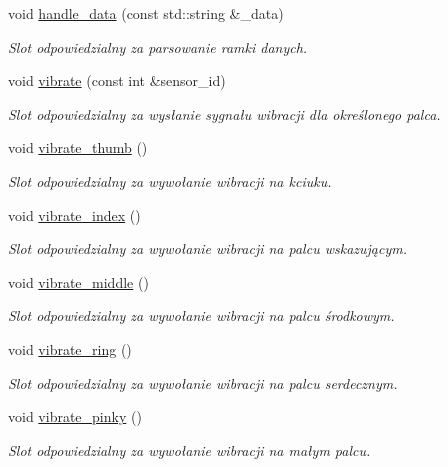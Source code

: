 \begin{DoxyCompactItemize}
void \hyperlink{class_main_window_ac19d30c65182c2d0e75a5be88471fdbd}{handle\+\_\+data} (const std\+::string \&\+\_\+data)
\begin{DoxyCompactList}\small\item\em Slot odpowiedzialny za parsowanie ramki danych. \end{DoxyCompactList}\item 
void \hyperlink{class_main_window_a3412d9c342cff27322e19266191c311a}{vibrate} (const int \&sensor\+\_\+id)
\begin{DoxyCompactList}\small\item\em Slot odpowiedzialny za wysłanie sygnału wibracji dla określonego palca. \end{DoxyCompactList}\item 
void \hyperlink{class_main_window_a297ac4c713baaf6eff4bc6aebef110ff}{vibrate\+\_\+thumb} ()
\begin{DoxyCompactList}\small\item\em Slot odpowiedzialny za wywołanie wibracji na kciuku. \end{DoxyCompactList}\item 
void \hyperlink{class_main_window_ad1b286f1dc9b3cd44283491c9356bea2}{vibrate\+\_\+index} ()
\begin{DoxyCompactList}\small\item\em Slot odpowiedzialny za wywołanie wibracji na palcu wskazującym. \end{DoxyCompactList}\item 
void \hyperlink{class_main_window_a017e5b2147ea4f7784b5e9f489d3bad3}{vibrate\+\_\+middle} ()
\begin{DoxyCompactList}\small\item\em Slot odpowiedzialny za wywołanie wibracji na palcu środkowym. \end{DoxyCompactList}\item 
void \hyperlink{class_main_window_aa115fb022ec2db4852785d5e41967fa0}{vibrate\+\_\+ring} ()
\begin{DoxyCompactList}\small\item\em Slot odpowiedzialny za wywołanie wibracji na palcu serdecznym. \end{DoxyCompactList}\item 
void \hyperlink{class_main_window_afd646ade55a2b1a61c21c0c1b45c2c67}{vibrate\+\_\+pinky} ()
\begin{DoxyCompactList}\small\item\em Slot odpowiedzialny za wywołanie wibracji na małym palcu. \end{DoxyCompactList}\item 

\end{DoxyCompactItemize}
